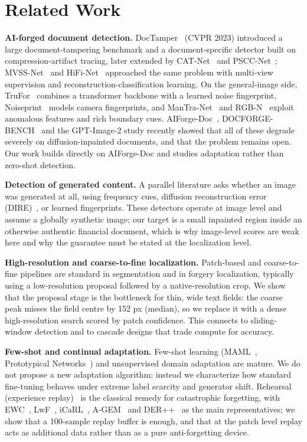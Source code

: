 \documentclass[preprint,12pt]{elsarticle}
\begin{document}
\section{Related Work}\label{related-work}

\textbf{AI-forged document detection.} DocTamper~\cite{qu2023doctamper} (CVPR 2023) introduced a large document-tampering benchmark and a document-specific detector built on compression-artifact tracing, later extended by CAT-Net~\cite{kwon2021catnet} and PSCC-Net~\cite{liu2022pscc}; MVSS-Net~\cite{chen2021mvss} and HiFi-Net~\cite{cao2022hifinet} approached the same problem with multi-view supervision and reconstruction-classification learning. On the general-image side, TruFor~\cite{guillaro2023trufor} combines a transformer backbone with a learned noise fingerprint, Noiseprint~\cite{cozzolino2019noiseprint} models camera fingerprints, and ManTra-Net~\cite{wang2019mantra} and RGB-N~\cite{zhou2018rgbn} exploit anomalous features and rich boundary cues. AIForge-Doc~\cite{wu2026aiforgedoc}, DOCFORGE-BENCH~\cite{zhao2026docforge} and the GPT-Image-2 study recently showed that all of these degrade severely on diffusion-inpainted documents, and that the problem remains open. Our work builds directly on AIForge-Doc and studies adaptation rather than zero-shot detection.

\textbf{Detection of generated content.} A parallel literature asks whether an image was generated at all, using frequency cues, diffusion reconstruction error (DIRE)~\cite{wang2023dire}, or learned fingerprints. These detectors operate at image level and assume a globally synthetic image; our target is a small inpainted region inside an otherwise authentic financial document, which is why image-level scores are weak here and why the guarantee must be stated at the localization level.

\textbf{High-resolution and coarse-to-fine localization.} Patch-based and coarse-to-fine pipelines are standard in segmentation and in forgery localization, typically using a low-resolution proposal followed by a native-resolution crop. We show that the proposal stage is the bottleneck for thin, wide text fields: the coarse peak misses the field centre by 152 px (median), so we replace it with a dense high-resolution search scored by patch confidence. This connects to sliding-window detection and to cascade designs that trade compute for accuracy.

\textbf{Few-shot and continual adaptation.} Few-shot learning (MAML~\cite{finn2017maml}, Prototypical Networks~\cite{snell2017proto}) and unsupervised domain adaptation are mature. We do not propose a new adaptation algorithm; instead we characterize how standard fine-tuning behaves under extreme label scarcity and generator shift. Rehearsal (experience replay)~\cite{rolnick2019replay} is the classical remedy for catastrophic forgetting, with EWC~\cite{kirkpatrick2017ewc}, LwF~\cite{li2017lwf}, iCaRL~\cite{rebuffi2017icarl}, A-GEM~\cite{chaudhry2019agem} and DER++~\cite{buzzega2020der} as the main representatives; we show that a 100-sample replay buffer is enough, and that at the patch level replay acts as additional data rather than as a pure anti-forgetting device.
\end{document}
